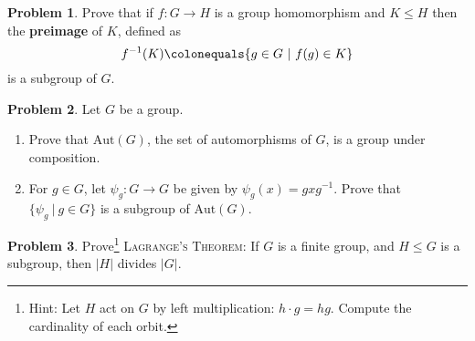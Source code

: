 \documentclass[11pt]{article}
\theoremstyle{definition}
\newtheorem{problem}{Problem}
\begin{document}
\noindent



\begin{problem}
Prove that if $f\!:G\to H$ is a group homomorphism and $K\leq H$ then the {\bf preimage} of $K$, defined as 
$$f^{-1}(K) \colonequals \{g\in G  \ |\ f(g)\in K\}$$ 
is a subgroup of $G$.
\end{problem}



\begin{problem} Let $G$ be a group.
\begin{enumerate}[(4.1)]
\item Prove that $\mathrm{Aut}(G)$, the set of automorphisms of $G$, is a group under composition.
\item For $g\in G$, let $\psi_g: G\to G$ be given by $\psi_g(x) = gxg^{-1}$. Prove that $\{ \psi_g \ | \ g\in G\}$ is a subgroup of $\mathrm{Aut}(G)$. 
\end{enumerate}
\end{problem}

\begin{problem} Prove\footnote{Hint: Let $H$ act on $G$ by left multiplication: $h \cdot g= hg$. Compute the cardinality of each orbit.} \textsc{Lagrange's Theorem:} If $G$ is a finite group, and $H\leq G$ is a subgroup, then $|H|$ divides $|G|$. 
\end{problem}
\end{document}
